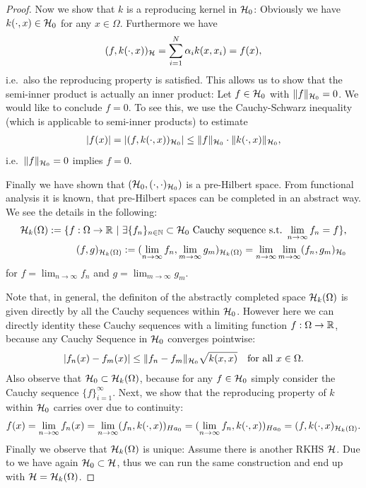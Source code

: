 \begin{proof}
Now we show that $k$ is a reproducing kernel in $\mathcal{H}_0$:
Obviously we have $k(\cdot, x) \in \mathcal{H}_0$ for any $x \in \Omega$.
Furthermore we have
\begin{align*}
(f, k(\cdot, x))_{\mathcal{H}} = \sum_{i=1}^N \alpha_i k(x, x_i) = f(x),
\end{align*}
i.e.\ also the reproducing property is satisfied.
This allows us to show that the semi-inner product is actually an inner product:
Let $f \in \mathcal{H}_0$ with $\Vert f \Vert_{\mathcal{H}_0} = 0$. 
We would like to conclude $f = 0$.
To see this, we use the Cauchy-Schwarz inequality (which is applicable to semi-inner products) to estimate
\begin{align*}
|f(x)| = |(f, k(\cdot, x))_{\mathcal{H}_0}| \leq \Vert f \Vert_{\mathcal{H}_0} \cdot \Vert k(\cdot, x) \Vert_{\mathcal{H}_0},
\end{align*}
i.e.\ $\Vert f \Vert_{\mathcal{H}_0} = 0$ implies $f = 0$.

Finally we have shown that $(\mathcal{H}_0, (\cdot, \cdot)_{\mathcal{H}_0})$ is a pre-Hilbert space.
From functional analysis it is known, that pre-Hilbert spaces can be completed in an abstract way. 
We see the details in the following:
\begin{align*}
\mathcal H_k (\Omega) := \{ f: \Omega \rightarrow \mathbb{R} ~ | ~ \exists \{ f_n \}_{n \in \mathbb{N}} \subset \mathcal{H}_0 ~ \text{Cauchy sequence s.t.~} \lim_{n\rightarrow \infty} f_n = f \}, \\
(f, g)_{\mathcal H_k (\Omega)} := (\lim_{n \rightarrow \infty} f_n, \lim_{m \rightarrow \infty} g_m)_{\mathcal H_k (\Omega)} = \lim_{n \rightarrow \infty} \lim_{m \rightarrow \infty} (f_n, g_m)_{\mathcal{H}_0}
\end{align*}
for $f = \lim_{n \rightarrow \infty} f_n$ and $g = \lim_{m \rightarrow \infty} g_m$.

Note that, in general, the definiton of the abstractly completed space $\mathcal H_k (\Omega)$ is given directly by all the Cauchy sequences within $\mathcal{H}_0$.
However here we can directly identity these Cauchy sequences with a limiting function $f: \Omega \rightarrow \mathbb{R}$, 
because any Cauchy Sequence in $\mathcal{H}_0$ converges pointwise:
\begin{align*}
|f_n(x) - f_m(x)| \leq \Vert f_n - f_m \Vert_{\mathcal{H}_0} \sqrt{k(x, x)} \quad \text{for all~} x \in \Omega.
\end{align*}
Also observe that $\mathcal{H}_0 \subset \mathcal H_k (\Omega)$, because for any $f \in \mathcal{H}_0$ simply consider the Cauchy sequence $\{ f \}_{i=1}^\infty$.
Next, we show that the reproducing property of $k$ within $\mathcal{H}_0$ carries over due to continuity:
\begin{align*}
f(x) = \lim_{n \rightarrow \infty} f_n(x) = \lim_{n \rightarrow \infty} (f_n, k(\cdot, x))_{Ha_0} = (\lim_{n \rightarrow \infty} f_n, k(\cdot, x))_{Ha_0} = (f, k(\cdot, x)_{\mathcal H_k (\Omega)}.
\end{align*}
Finally we observe that $\mathcal H_k (\Omega)$ is unique:
Assume there is another RKHS $\mathcal{H}$. 
Due to  we have again $\mathcal{H}_0 \subset \mathcal{H}$, 
thus we can run the same construction and end up with $\mathcal{H} = \mathcal H_k (\Omega)$.




\end{proof}


